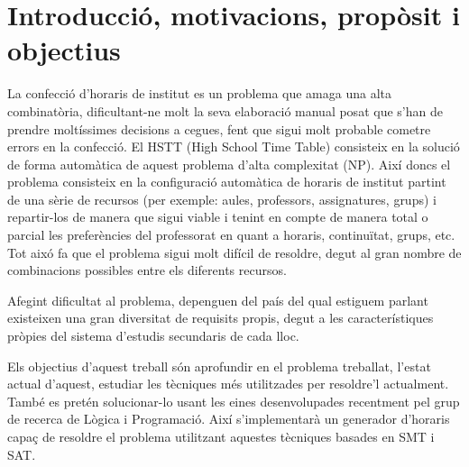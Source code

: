 \documentclass[11pt,a4paper,twoside]{report}
\begin{document}
  \tableofcontents
  
  \chapter{Introducció, motivacions, propòsit i objectius}
  

  La confecció d'horaris de institut es un problema que amaga una alta combinatòria, dificultant-ne molt la seva elaboració manual posat que s'han de prendre moltíssimes decisions a cegues, 
  fent que sigui molt probable cometre errors en la confecció. El HSTT (High School Time Table) consisteix en la solució de forma automàtica de aquest problema d'alta complexitat (NP). 
  Així doncs el problema consisteix en la configuració automàtica de horaris de institut partint de una sèrie de recursos 
  (per exemple: aules, professors, assignatures, grups) i repartir-los de manera que sigui viable i tenint en compte 
  de manera total o parcial les preferències del professorat en quant a horaris, continuïtat, grups, etc. Tot aixó fa que el problema sigui molt difícil de resoldre, degut al gran nombre de combinacions possibles entre els diferents recursos.
  
  Afegint dificultat al problema, depenguen del país del qual estiguem parlant existeixen una gran diversitat de requisits propis, degut a les característiques pròpies del sistema d'estudis secundaris de cada lloc.
  
  Els objectius d'aquest treball són aprofundir en el problema treballat, l'estat actual d'aquest, estudiar les tècniques més utilitzades per resoldre'l actualment. També es pretén solucionar-lo usant les eines desenvolupades recentment pel grup de recerca de Lògica i Programació. Així s'implementarà un generador 
  d'horaris capaç de resoldre el problema utilitzant aquestes tècniques basades en SMT i SAT.
  
\end{document}
